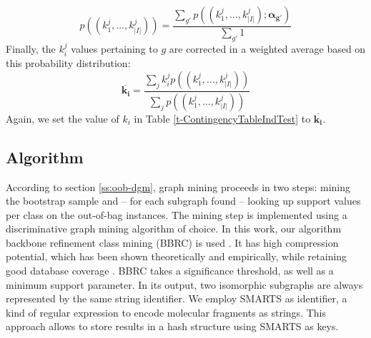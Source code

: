 \documentclass{article}
\begin{document}
\begin{equation}
  p((k_1^j,\ldots,k_{\vert I\vert}^j))=\frac{\sum_{g'} p((k_1^j,\ldots,k_{\vert I\vert}^j); \mathbf{\alpha_{g'}})}{\sum_{g'}1}
  \label{eqn:avgpr}
\end{equation}
Finally, the $k_i^j$ values pertaining to $g$ are corrected in a weighted average
based on this probability distribution:
\begin{equation}
  \overline{\mathbf{k_i}}=\frac{\sum_j k_i^j p((k_1^j,\ldots,k_{\vert I\vert}^j))}{\sum_j p((k_1^j,\ldots,k_{\vert I\vert}^j))}
  \label{eqn:avgki}
\end{equation}
Again, we set the value of $k_i$ in Table \ref{t-ContingencyTableIndTest} to $\overline{\mathbf{k_i}}$.

\subsection{Algorithm}
\label{s:Algorithm}
According to section \ref{ss:oob-dgm}, graph mining proceeds in two steps:
mining the bootstrap sample and -- for each subgraph found -- looking up
support values per class on the out-of-bag instances.  The mining step is
implemented using a discriminative graph mining algorithm of choice. In this
work, our algorithm backbone refinement class mining (BBRC) is used
\cite{maunz09largescale}. It has high compression potential, which has been
shown theoretically and empirically, while retaining good database coverage
\cite{maunz11efficient}. BBRC takes a significance threshold, as well as a
minimum support parameter. In its output, two isomorphic subgraphs are always
represented by the same string identifier.  We employ SMARTS as identifier, a
kind of regular expression to encode molecular fragments as strings.  This
approach allows to store results in a hash structure using SMARTS as keys.
\end{document}
